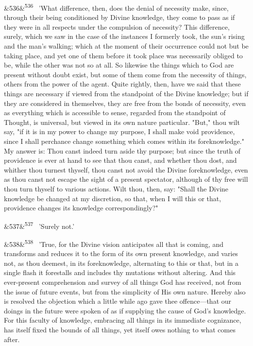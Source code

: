 \documentclass[12pt]{article}
\newcommand{\para}[1][]{\par\noindent\ifx&#1&\else\textsuperscript{\footnotesize #1}~\fi}
\begin{document}
\para[536] 'What difference, then, does the denial of necessity make, since, through their being conditioned by Divine knowledge, they come to pass as if they were in all respects under the compulsion of necessity? This difference, surely, which we saw in the case of the instances I formerly took, the sun's rising and the man's walking; which at the moment of their occurrence could not but be taking place, and yet one of them before it took place was necessarily obliged to be, while the other was not so at all. So likewise the things which to God are present without doubt exist, but some of them come from the necessity of things, others from the power of the agent. Quite rightly, then, have we said that these things are necessary if viewed from the standpoint of the Divine knowledge; but if they are considered in themselves, they are free from the bonds of necessity, even as everything which is accessible to sense, regarded from the standpoint of Thought, is universal, but viewed in its own nature particular. "But," thou wilt say, "if it is in my power to change my purpose, I shall make void providence, since I shall perchance change something which comes within its foreknowledge." My answer is: Thou canst indeed turn aside thy purpose; but since the truth of providence is ever at hand to see that thou canst, and whether thou dost, and whither thou turnest thyself, thou canst not avoid the Divine foreknowledge, even as thou canst not escape the sight of a present spectator, although of thy free will thou turn thyself to various actions. Wilt thou, then, say: "Shall the Divine knowledge be changed at my discretion, so that, when I will this or that, providence changes its knowledge correspondingly?"

\para[537] 'Surely not.'

\para[538] 'True, for the Divine vision anticipates all that is coming, and transforms and reduces it to the form of its own present knowledge, and varies not, as thou deemest, in its foreknowledge, alternating to this or that, but in a single flash it forestalls and includes thy mutations without altering. And this ever-present comprehension and survey of all things God has received, not from the issue of future events, but from the simplicity of His own nature. Hereby also is resolved the objection which a little while ago gave thee offence---that our doings in the future were spoken of as if supplying the cause of God's knowledge. For this faculty of knowledge, embracing all things in its immediate cognizance, has itself fixed the bounds of all things, yet itself owes nothing to what comes after.
\end{document}

